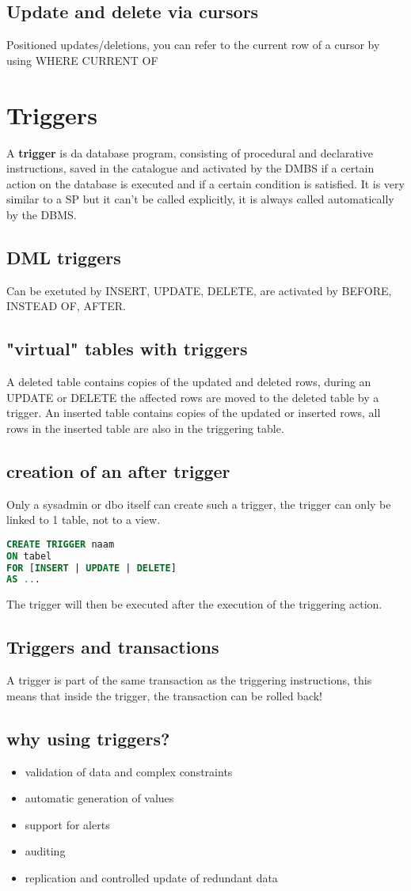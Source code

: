 \documentclass{report}
\begin{document}
			\subsection{Update and delete via cursors}
				Positioned updates/deletions, you can refer to the current row of a cursor by using WHERE CURRENT OF
		\section{Triggers}
			A \textbf{trigger} is da database program, consisting of procedural and declarative instructions, saved in the catalogue and activated by the DMBS if a certain action on the database is executed and if a certain condition is satisfied. It is very similar to a SP but it can't be called explicitly, it is always called automatically by the DBMS.
			\subsection{DML triggers}
				Can be exetuted by INSERT, UPDATE, DELETE, are activated by BEFORE, INSTEAD OF, AFTER.
			\subsection{"virtual" tables with triggers}
				A deleted table contains copies of the updated and deleted rows, during an UPDATE or DELETE the affected rows are moved to the deleted table by a trigger. An inserted table contains copies of the updated or inserted rows, all rows in the inserted table are also in the triggering table. 
			\subsection{creation of an after trigger}
				Only a sysadmin or dbo itself can create such a trigger, the trigger can only be linked to 1 table, not to a view. 
				\begin{lstlisting}[language=sql]
CREATE TRIGGER naam
ON tabel
FOR [INSERT | UPDATE | DELETE]
AS ... \end{lstlisting}
				The trigger will then be executed after the execution of the triggering action.
			\subsection{Triggers and transactions}
				A trigger is part of the same transaction as the triggering instructions, this means that inside the trigger, the transaction can be rolled back!
			\subsection{why using triggers?}
				\begin{itemize}
					\item validation of data and complex constraints 
					\item automatic generation of values
					\item support for alerts
					\item auditing
					\item replication and controlled update of redundant data
				\end{itemize}
\end{document}
